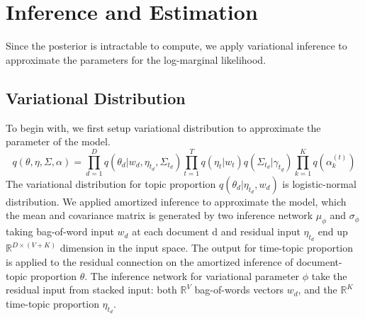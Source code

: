 \section{Inference and Estimation}
Since the posterior is intractable to compute, we apply variational inference to approximate the parameters for the log-marginal likelihood.
\subsection{Variational Distribution}
To begin with, we first setup variational distribution to approximate the parameter of the model. 
\begin{equation}
q(\theta,\eta,\Sigma,\alpha)=\prod_{d=1}^{D}q(\theta_d|w_d,\eta_{t_d},\Sigma_{t_d})\prod_{t=1}^{T}q(\eta_t|w_t)q(\Sigma_{t_d}|\gamma_{t_d})\prod_{k=1}^{K}q(\alpha_k^{(t)})
\end{equation}
The variational distribution for topic proportion $ q(\theta_d|\eta_{t_d},w_d) $ is logistic-normal distribution. We applied amortized inference to approximate the model, which the mean and covariance matrix is generated by two inference network $ \mu_\phi $ and $ \sigma_\phi $ taking bag-of-word input $ w_d $ at each document d and residual input $ \eta_{t_d} $ end up $ \mathbb{R}^{D\times (V+K)} $ dimension in the input space.
The output for time-topic proportion is applied to the residual connection on the amortized inference of document-topic proportion $ \theta $. The inference network for variational parameter $ \phi $ take the residual input from stacked input: both $ \mathbb{R}^{V} $ bag-of-words vectors $ w_d $, and the $ \mathbb{R}^{K} $ time-topic proportion $ \eta_{t_d} $.

